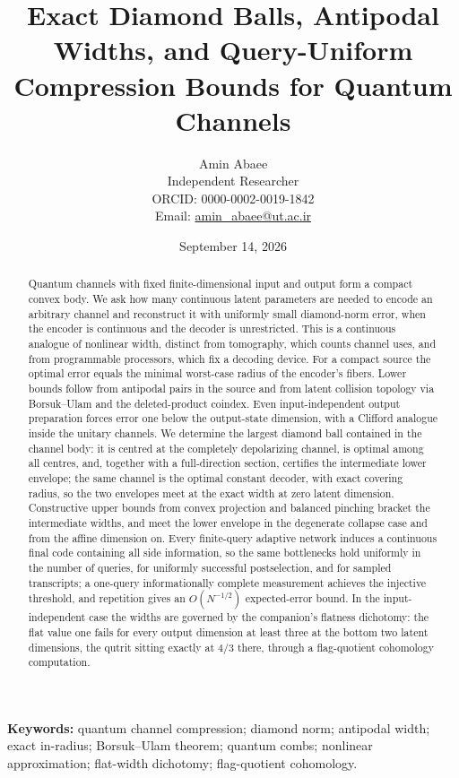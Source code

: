 \documentclass[11pt,a4paper]{article}
\title{Exact Diamond Balls, Antipodal Widths, and Query-Uniform Compression Bounds for Quantum Channels}
\author{Amin Abaee\\
\small Independent Researcher\\
\small ORCID: 0000-0002-0019-1842\\
\small Email: \href{mailto:amin\_abaee@ut.ac.ir}{amin\_abaee@ut.ac.ir}}
\date{September 14, 2026}
\theoremstyle{definition}
\theoremstyle{plain}
\theoremstyle{remark}
\begin{document}
\maketitle

\begin{abstract}
Quantum channels with fixed finite-dimensional input and output form a compact convex body. We ask how many continuous latent parameters are needed to encode an arbitrary channel and reconstruct it with uniformly small diamond-norm error, when the encoder is continuous and the decoder is unrestricted. This is a continuous analogue of nonlinear width, distinct from tomography, which counts channel uses, and from programmable processors, which fix a decoding device. For a compact source the optimal error equals the minimal worst-case radius of the encoder's fibers. Lower bounds follow from antipodal pairs in the source and from latent collision topology via Borsuk--Ulam and the deleted-product coindex. Even input-independent output preparation forces error one below the output-state dimension, with a Clifford analogue inside the unitary channels. We determine the largest diamond ball contained in the channel body: it is centred at the completely depolarizing channel, is optimal among all centres, and, together with a full-direction section, certifies the intermediate lower envelope; the same channel is the optimal constant decoder, with exact covering radius, so the two envelopes meet at the exact width at zero latent dimension. Constructive upper bounds from convex projection and balanced pinching bracket the intermediate widths, and meet the lower envelope in the degenerate collapse case and from the affine dimension on. Every finite-query adaptive network induces a continuous final code containing all side information, so the same bottlenecks hold uniformly in the number of queries, for uniformly successful postselection, and for sampled transcripts; a one-query informationally complete measurement achieves the injective threshold, and repetition gives an $O(N^{-1/2})$ expected-error bound. In the input-independent case the widths are governed by the companion's flatness dichotomy: the flat value one fails for every output dimension at least three at the bottom two latent dimensions, the qutrit sitting exactly at $4/3$ there, through a flag-quotient cohomology computation.
\end{abstract}

\noindent\textbf{Keywords:} quantum channel compression; diamond norm; antipodal width; exact in-radius; Borsuk--Ulam theorem; quantum combs; nonlinear approximation; flat-width dichotomy; flag-quotient cohomology.
\end{document}
